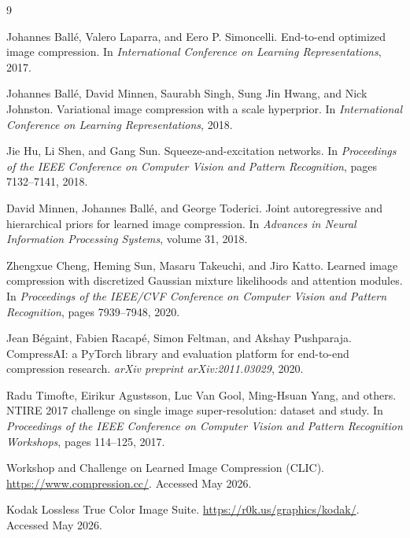 \documentclass[10pt]{article}
\begin{document}
\begin{thebibliography}{9}

Johannes Ball\'e, Valero Laparra, and Eero P. Simoncelli.
\newblock End-to-end optimized image compression.
\newblock In \emph{International Conference on Learning Representations}, 2017.

Johannes Ball\'e, David Minnen, Saurabh Singh, Sung Jin Hwang, and Nick Johnston.
\newblock Variational image compression with a scale hyperprior.
\newblock In \emph{International Conference on Learning Representations}, 2018.

Jie Hu, Li Shen, and Gang Sun.
\newblock Squeeze-and-excitation networks.
\newblock In \emph{Proceedings of the IEEE Conference on Computer Vision and Pattern Recognition}, pages 7132--7141, 2018.

David Minnen, Johannes Ball\'e, and George Toderici.
\newblock Joint autoregressive and hierarchical priors for learned image compression.
\newblock In \emph{Advances in Neural Information Processing Systems}, volume 31, 2018.

Zhengxue Cheng, Heming Sun, Masaru Takeuchi, and Jiro Katto.
\newblock Learned image compression with discretized Gaussian mixture likelihoods and attention modules.
\newblock In \emph{Proceedings of the IEEE/CVF Conference on Computer Vision and Pattern Recognition}, pages 7939--7948, 2020.

Jean B\'egaint, Fabien Racap\'e, Simon Feltman, and Akshay Pushparaja.
\newblock CompressAI: a PyTorch library and evaluation platform for end-to-end compression research.
\newblock \emph{arXiv preprint arXiv:2011.03029}, 2020.

Radu Timofte, Eirikur Agustsson, Luc Van Gool, Ming-Hsuan Yang, and others.
\newblock NTIRE 2017 challenge on single image super-resolution: dataset and study.
\newblock In \emph{Proceedings of the IEEE Conference on Computer Vision and Pattern Recognition Workshops}, pages 114--125, 2017.

Workshop and Challenge on Learned Image Compression (CLIC).
\newblock \url{https://www.compression.cc/}. Accessed May 2026.

Kodak Lossless True Color Image Suite.
\newblock \url{https://r0k.us/graphics/kodak/}. Accessed May 2026.

\end{thebibliography}
\end{document}
